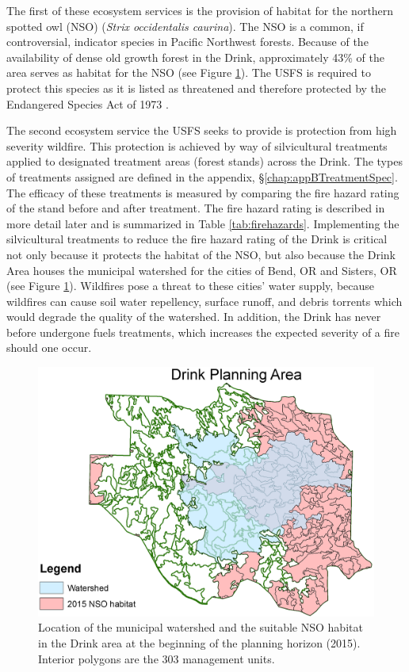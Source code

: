 The first of these ecosystem services is the provision of habitat for the northern spotted owl (NSO) (\textit{Strix occidentalis caurina}). The NSO is a common, if controversial, indicator species in Pacific Northwest forests. Because of the availability of dense old growth forest in the Drink, approximately 43\% of the area serves as habitat for the NSO (see Figure \ref{fig:drinkOwlAndWatershed}). The USFS is required to protect this species as it is listed as threatened and therefore protected by the Endangered Species Act of 1973 \cite{congress1973endangered}.

The second ecosystem service the USFS seeks to provide is protection from high severity wildfire. This protection is achieved by way of silvicultural treatments applied to designated treatment areas (forest stands) across the Drink. The types of treatments assigned are defined in the appendix, \S \ref{chap:appBTreatmentSpec}. The efficacy of these treatments is measured by comparing the fire hazard rating of the stand before and after treatment. The fire hazard rating is described in more detail later and is summarized in Table \ref{tab:firehazards}. Implementing the silvicultural treatments to reduce the fire hazard rating of the Drink is critical not only because it protects the habitat of the NSO, but also because the Drink Area houses the municipal watershed for the cities of Bend, OR and Sisters, OR (see Figure \ref{fig:drinkOwlAndWatershed}). Wildfires pose a threat to these cities' water supply, because wildfires can cause soil water repellency, surface runoff, and debris torrents \cite{ice2004effects} which would degrade the quality of the watershed. In addition, the Drink has never before undergone fuels treatments, which increases the expected severity of a fire should one occur. 
\begin{figure}
\centering
\includegraphics[width=.5\textwidth]{../images/DrinkMap_NSOAndWatershed}
\caption[NSO Habitat and municipal watershed in the Drink Planning Area]{Location of the municipal watershed and the suitable NSO habitat in the Drink area at the beginning of the planning horizon (2015). Interior polygons are the 303 management units.}
\label{fig:drinkOwlAndWatershed}
\end{figure}

